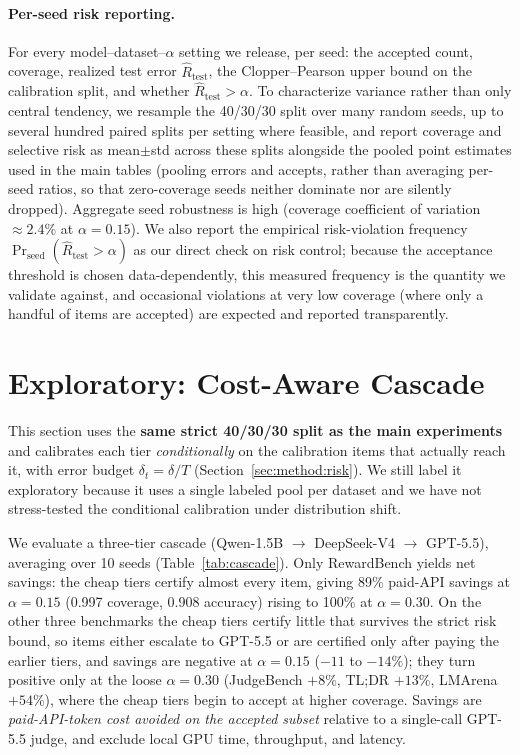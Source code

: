 \paragraph{Per-seed risk reporting.}
For every model--dataset--$\alpha$ setting we release, per seed: the accepted count, coverage, realized test error $\hat R_{\text{test}}$, the Clopper--Pearson upper bound on the calibration split, and whether $\hat R_{\text{test}}>\alpha$. To characterize variance rather than only central tendency, we resample the 40/30/30 split over many random seeds, up to several hundred paired splits per setting where feasible, and report coverage and selective risk as mean$\pm$std across these splits alongside the pooled point estimates used in the main tables (pooling errors and accepts, rather than averaging per-seed ratios, so that zero-coverage seeds neither dominate nor are silently dropped). Aggregate seed robustness is high (coverage coefficient of variation $\approx2.4\%$ at $\alpha{=}0.15$). We also report the empirical risk-violation frequency $\Pr_{\text{seed}}(\hat R_{\text{test}}>\alpha)$ as our direct check on risk control; because the acceptance threshold is chosen data-dependently, this measured frequency is the quantity we validate against, and occasional violations at very low coverage (where only a handful of items are accepted) are expected and reported transparently.

\section{Exploratory: Cost-Aware Cascade}
\label{app:cascade}

This section uses the \textbf{same strict 40/30/30 split as the main experiments} and calibrates each tier \emph{conditionally} on the calibration items that actually reach it, with error budget $\delta_t=\delta/T$ (Section~\ref{sec:method:risk}). We still label it exploratory because it uses a single labeled pool per dataset and we have not stress-tested the conditional calibration under distribution shift.

We evaluate a three-tier cascade (Qwen-1.5B $\to$ DeepSeek-V4 $\to$ GPT-5.5), averaging over 10 seeds (Table~\ref{tab:cascade}). Only RewardBench yields net savings: the cheap tiers certify almost every item, giving 89\% paid-API savings at $\alpha{=}0.15$ (0.997 coverage, 0.908 accuracy) rising to 100\% at $\alpha{=}0.30$. On the other three benchmarks the cheap tiers certify little that survives the strict risk bound, so items either escalate to GPT-5.5 or are certified only after paying the earlier tiers, and savings are negative at $\alpha{=}0.15$ ($-11$ to $-14\%$); they turn positive only at the loose $\alpha{=}0.30$ (JudgeBench $+8\%$, TL;DR $+13\%$, LMArena $+54\%$), where the cheap tiers begin to accept at higher coverage. Savings are \emph{paid-API-token cost avoided on the accepted subset} relative to a single-call GPT-5.5 judge, and exclude local GPU time, throughput, and latency.

